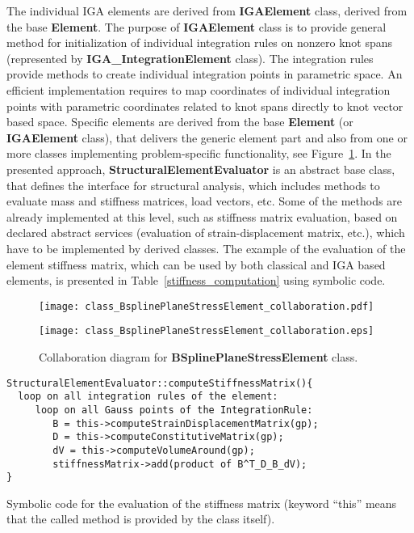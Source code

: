 \documentclass[a4paper]{article}
\newcommand{\class}[1]{{\bf #1}}
\begin{document}
The individual IGA elements are derived from \class{IGAElement} class,
derived from the base \class{Element}. The purpose of \class{IGAElement}
class is to provide general method for initialization of individual
integration rules on nonzero knot spans (represented by
\class{IGA\_IntegrationElement} class). The integration rules provide
methods to create individual integration points in parametric
space. An efficient implementation requires to map coordinates of
individual integration points with parametric coordinates related to
knot spans directly to knot vector based space. Specific elements are
derived from the base \class{Element} (or  \class{IGAElement} class), that
delivers the generic element part and also from one or more classes
implementing problem-specific functionality, see
Figure~\ref{BSplinePlaneStressElement}. In the presented approach,
\class{StructuralElementEvaluator} is an abstract base class, that
defines the interface for structural analysis, which includes methods
to evaluate mass and stiffness matrices, load vectors, etc. Some of
the methods are already implemented at this level, such as stiffness
matrix evaluation, based on declared abstract services (evaluation of
strain-displacement matrix, etc.), which have to be implemented by
derived classes. The example of the evaluation of the element stiffness matrix,
which can be used by both classical and IGA based elements, is
presented in Table~\ref{stiffness_computation} using symbolic
code.

\begin{figure}[b!]
\begin{center}
\ifpdf
\centerline{\texttt{[image: class\_BsplinePlaneStressElement\_collaboration.pdf]}}
\else
\centerline{\texttt{[image: class\_BsplinePlaneStressElement\_collaboration.eps]}}
\fi
\caption{Collaboration diagram for \class{BSplinePlaneStressElement} class.}
\label{BSplinePlaneStressElement}
\end{center}
\vspace{-5mm}
\end{figure}

\begin{table}[t]
\footnotesize
\begin{verbatim}
StructuralElementEvaluator::computeStiffnessMatrix(){
  loop on all integration rules of the element:
     loop on all Gauss points of the IntegrationRule:
        B = this->computeStrainDisplacementMatrix(gp);
        D = this->computeConstitutiveMatrix(gp);
        dV = this->computeVolumeAround(gp);
        stiffnessMatrix->add(product of B^T_D_B_dV); 
}
\end{verbatim}
\caption{Symbolic code for the evaluation of the stiffness matrix
	(keyword ``this'' means that the called method is provided by the
	class itself).}
\label{stiffness_computation}
\end{table}
\end{document}
